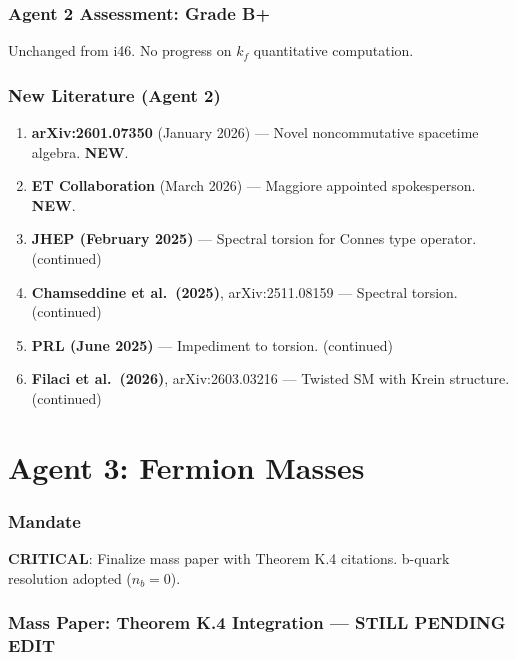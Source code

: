 \documentclass[11pt,a4paper]{article}
\newcommand{\NEW}{\textcolor{dfdblue}{\textbf{NEW}}}
\begin{document}
\section{Agent 2 Assessment: Grade B+}

Unchanged from i46. No progress on $k_f$ quantitative computation.

\section{New Literature (Agent 2)}

\begin{enumerate}
\item \textbf{arXiv:2601.07350} (January 2026) --- Novel noncommutative spacetime algebra. \NEW.
\item \textbf{ET Collaboration} (March 2026) --- Maggiore appointed spokesperson. \NEW.
\item \textbf{JHEP (February 2025)} --- Spectral torsion for Connes type operator. (continued)
\item \textbf{Chamseddine et al.\ (2025)}, arXiv:2511.08159 --- Spectral torsion. (continued)
\item \textbf{PRL (June 2025)} --- Impediment to torsion. (continued)
\item \textbf{Filaci et al.\ (2026)}, arXiv:2603.03216 --- Twisted SM with Krein structure. (continued)
\end{enumerate}


\part{Agent 3: Fermion Masses}
\label{part:agent3}

\section{Mandate}

\textbf{CRITICAL}: Finalize mass paper with Theorem K.4 citations. b-quark resolution adopted ($n_b = 0$).

\section{Mass Paper: Theorem K.4 Integration --- STILL PENDING EDIT}
\end{document}
